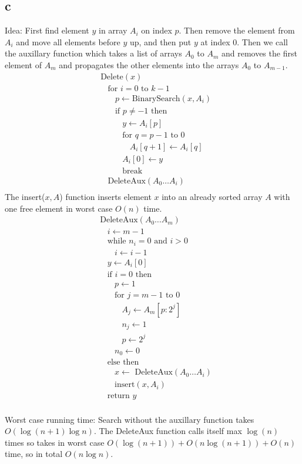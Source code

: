 \documentclass[koma,a4paper]{article}
\begin{document}
\subsection{c}
Idea: First find element $y$ in array $A_i$ on index $p$. Then remove the element from $A_i$ and move all elements before $y$ up, and then put $y$ at index 0. Then we call the auxillary function which takes a list of arrays $A_0$ to $A_m$ and removes the first element of $A_m$ and propagates the other elements into the arrays $A_0$ to $A_{m-1}$.
\begin{align*}
  &\text{Delete}(x)\\
  &~~~~\text{for } i=0 \text{ to } k-1\\
  &~~~~~~~~p \leftarrow \text{BinarySearch}(x, A_i)\\
  &~~~~~~~~\text{if } p \neq -1 \text{ then}\\
  &~~~~~~~~~~~~y \leftarrow A_i[p]\\
  &~~~~~~~~~~~~\text{for } q=p-1 \text{ to } 0\\
  &~~~~~~~~~~~~~~~~A_i[q+1] \leftarrow A_i[q]\\
  &~~~~~~~~~~~~A_i[0] \leftarrow y\\
  &~~~~~~~~~~~~\text{break}\\
  &~~~~\text{DeleteAux}(A_0\ldots A_i)\\
\end{align*}
The insert($x, A$) function inserts element $x$ into an already sorted array $A$ with one free element in worst case $O(n)$ time.
\begin{align*}
  &\text{DeleteAux}(A_0\ldots A_m)\\
  &~~~~i \leftarrow m-1\\
  &~~~~\text{while } n_i = 0 \text{ and } i > 0\\
  &~~~~~~~~i \leftarrow i - 1\\
  &~~~~y \leftarrow A_i[0]\\
  &~~~~\text{if } i = 0 \text{ then}\\
  &~~~~~~~~p \leftarrow 1\\
  &~~~~~~~~\text{for } j=m-1 \text{ to } 0\\
  &~~~~~~~~~~~~A_j \leftarrow A_m[p:2^j]\\
  &~~~~~~~~~~~~n_j \leftarrow 1\\
  &~~~~~~~~~~~~p \leftarrow 2^j\\
  &~~~~~~~~n_0 \leftarrow 0\\
  &~~~~\text{else then}\\
  &~~~~~~~~x \leftarrow \text{ DeleteAux}(A_0\ldots A_i)\\
  &~~~~~~~~\text{insert}(x, A_i)\\
  &~~~~\text{return } y\\
\end{align*}

Worst case running time: Search without the auxillary function takes $O(\log(n+1) \log n)$. The DeleteAux function calls itself max $\log(n)$ times so takes in worst case $O(\log(n+1)) + O(n \log(n+1)) + O(n)$ time, so in total $O(n \log n)$.
\end{document}

